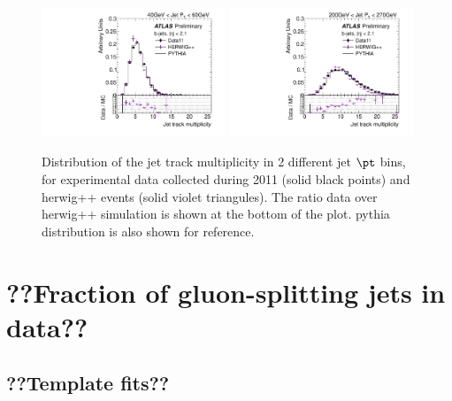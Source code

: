 \begin{figure}[tp]
\centering
\includegraphics[width=0.49\textwidth]{FIGS/systematics/DataVarNtrkPT040.pdf}
\includegraphics[width=0.49\textwidth]{FIGS/systematics/DataVarNtrkPT200.pdf}
\caption{Distribution of the jet track multiplicity in 2 different jet $\pt$ bins, for experimental data  collected during 2011 (solid black points) and {\sc herwig}++ events (solid violet triangules). The ratio data over {\sc herwig}++ simulation is shown at the bottom of the plot. {\sc pythia} distribution is also shown for reference.}
\label{fig:herwigdatamc}
\end{figure}



%
%
\chapter{??Fraction of gluon-splitting jets in data??}\label{chap:gbbfraction}

\section{??Template fits??}\label{sec:FractionSystematics}

